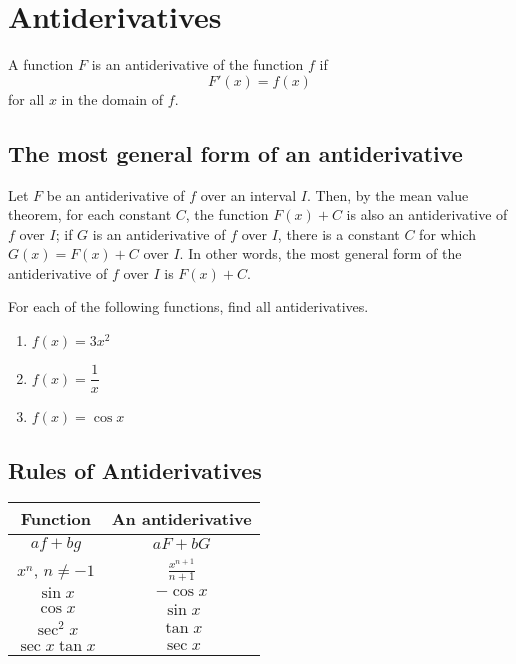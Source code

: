 
\hypertarget{antiderivatives}{%
\section{Antiderivatives}\label{antiderivatives}}

\begin{definition}

A function \(F\) is an antiderivative of the function \(f\) if
\[F'(x)=f(x)\] for all \(x\) in the domain of \(f\).

\end{definition}

\hypertarget{the-most-general-form-of-an-antiderivative}{%
\subsection{The most general form of an
antiderivative}\label{the-most-general-form-of-an-antiderivative}}

Let \(F\) be an antiderivative of \(f\) over an interval \(I\). Then, by
the mean value theorem, for each constant \(C\), the function \(F(x)+C\)
is also an antiderivative of \(f\) over \(I\); if \(G\) is an
antiderivative of \(f\) over \(I\), there is a constant \(C\) for which
\(G(x)=F(x)+C\) over \(I\). In other words, the most general form of the
antiderivative of \(f\) over \(I\) is \(F(x)+C\).

\begin{example}

For each of the following functions, find all antiderivatives.

\begin{enumerate}
\item
  \(f(x)=3x^2\)
\item
  \(f(x)=\dfrac{1}{x}\)
\item
  \(f(x)=\cos x\)
\end{enumerate}

\end{example}

\hypertarget{rules-of-antiderivatives}{%
\subsection{Rules of Antiderivatives}\label{rules-of-antiderivatives}}

\begin{longtable}[]{@{}cc@{}}
\toprule()
Function & An antiderivative \\
\midrule()
\endhead
\(af+bg\) & \(aF+bG\) \\
\(x^n\), \(n\neq -1\) & \(\frac{x^{n+1}}{n+1}\) \\
\(\sin x\) & \(-\cos x\) \\
\(\cos x\) & \(\sin x\) \\
\(\sec^2x\) & \(\tan x\) \\
\(\sec x\tan x\) & \(\sec x\) \\
\bottomrule()
\end{longtable}

